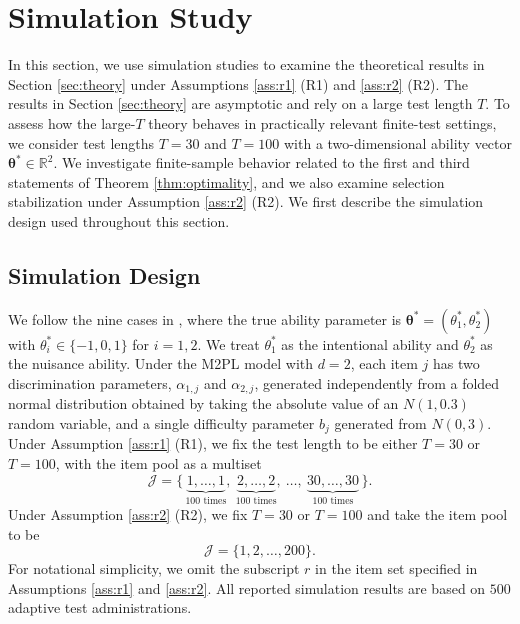 \documentclass[12pt]{article}
\begin{document}
\section{Simulation Study}
\label{sec:simulation}
In this section, we use simulation studies to examine the theoretical results in Section \ref{sec:theory} under Assumptions \ref{ass:r1} (R1) and \ref{ass:r2} (R2). The results in Section \ref{sec:theory} are asymptotic and rely on a large test length $T$. To assess how the large-$T$ theory behaves in practically relevant finite-test settings, we consider test lengths $T=30$ and $T=100$ with a two-dimensional ability vector $\boldsymbol{\theta}^{\ast} \in \mathbb{R}^2$. We investigate finite-sample behavior related to the first and third statements of Theorem \ref{thm:optimality}, and we also examine selection stabilization under Assumption \ref{ass:r2} (R2). We first describe the simulation design used throughout this section.




\subsection{Simulation Design} \label{sub:design}
We follow the nine cases in , where the true ability parameter is $\boldsymbol{\theta}^{\ast} = (\theta_1^{\ast}, \theta_2^{\ast})$ with $\theta_i^{\ast} \in  \{-1, 0, 1\}$ for $i = 1,2$. We treat $\theta_1^{\ast}$ as the intentional ability and $\theta_2^{\ast}$ as the nuisance ability. Under the M2PL model with $d = 2$, each item $j$ has two discrimination parameters, $\alpha_{1,j}$ and $\alpha_{2,j}$, generated independently from a folded normal distribution obtained by taking the absolute value of an $N(1,0.3)$ random variable, and a single difficulty parameter $b_j$ generated from $N(0,3)$. 
Under Assumption \ref{ass:r1} (R1), we fix the test length to be either $T = 30$ or $T = 100$, with the item pool as a multiset 
\begin{equation*} 
\mathcal{J} = \{\,\underbrace{1,\ldots,1}_{100 \text{ times}},\
\underbrace{2,\ldots,2}_{100 \text{ times}},\ \ldots,\
\underbrace{30,\ldots,30}_{100 \text{ times}}\,\}.
\end{equation*}
Under Assumption \ref{ass:r2} (R2), we fix $T = 30$ or $T = 100$ and take the item pool to be 
\begin{equation*} 
\mathcal{J} = \{1,2,\dots,200\}.  
\end{equation*} 
For notational simplicity, we omit the subscript $r$ in the item set specified in Assumptions \ref{ass:r1} and \ref{ass:r2}. All reported simulation results are based on $500$ adaptive test administrations.
\end{document}
